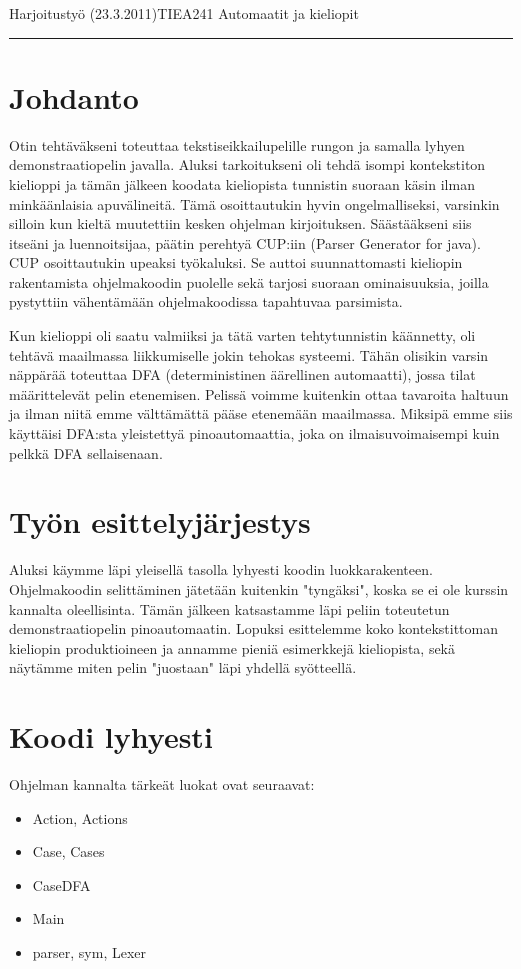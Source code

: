 \documentclass[a4paper,12pt,finnish]{article}
\begin{document}
\noindent
Harjoitustyö  (23.3.2011)\hfill TIEA241 Automaatit ja kieliopit
\hrule

\section {Johdanto}
Otin tehtäväkseni toteuttaa tekstiseikkailupelille rungon ja samalla lyhyen demonstraatiopelin javalla. Aluksi tarkoitukseni
oli tehdä isompi kontekstiton kielioppi ja tämän jälkeen koodata kieliopista tunnistin suoraan käsin ilman minkäänlaisia
apuvälineitä. Tämä osoittautukin hyvin ongelmalliseksi, varsinkin silloin kun kieltä muutettiin kesken ohjelman kirjoituksen.
Säästääkseni siis itseäni ja luennoitsijaa, päätin perehtyä CUP:iin (Parser Generator for java). CUP osoittautukin
upeaksi työkaluksi. Se auttoi suunnattomasti kieliopin rakentamista ohjelmakoodin puolelle sekä tarjosi suoraan ominaisuuksia,
joilla pystyttiin vähentämään ohjelmakoodissa tapahtuvaa parsimista. \\
\newline

 Kun kielioppi oli saatu valmiiksi ja tätä varten tehtytunnistin käännetty, oli tehtävä maailmassa liikkumiselle jokin
tehokas systeemi. Tähän olisikin varsin näppärää toteuttaa DFA (deterministinen äärellinen automaatti), jossa tilat
määrittelevät pelin etenemisen. Pelissä voimme kuitenkin ottaa tavaroita haltuun ja ilman niitä emme välttämättä
pääse etenemään maailmassa. Miksipä emme siis käyttäisi DFA:sta yleistettyä pinoautomaattia, joka on ilmaisuvoimaisempi
kuin pelkkä DFA sellaisenaan.


\section {Työn esittelyjärjestys}
Aluksi käymme läpi yleisellä tasolla lyhyesti koodin luokkarakenteen.
Ohjelmakoodin selittäminen jätetään kuitenkin "tyngäksi", koska se ei ole kurssin kannalta oleellisinta. Tämän jälkeen katsastamme läpi
peliin toteutetun demonstraatiopelin pinoautomaatin. Lopuksi esittelemme koko kontekstittoman
kieliopin produktioineen ja annamme pieniä esimerkkejä kieliopista, sekä näytämme miten pelin "juostaan" läpi yhdellä syötteellä.

\newpage
\section {Koodi lyhyesti}
Ohjelman kannalta tärkeät luokat ovat seuraavat:
\begin {itemize}
\item Action, Actions
\item Case, Cases
\item CaseDFA
\item Main
\item parser, sym, Lexer
\end  {itemize}
\end{document}
